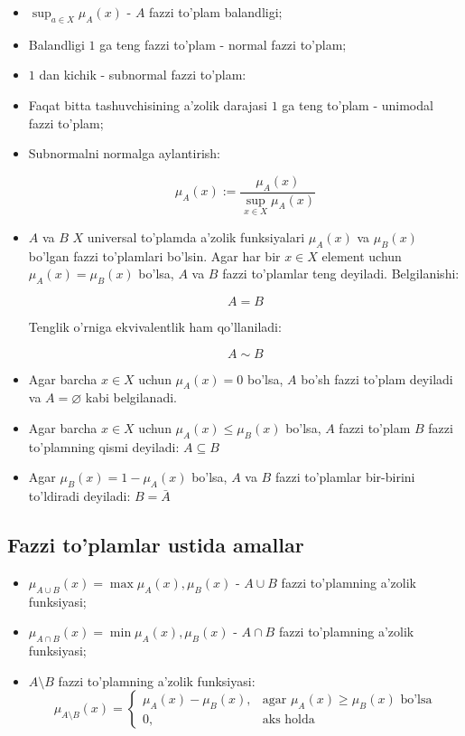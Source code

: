 \documentclass[12pt]{article}
\begin{document}
\begin{itemize}
	\item $\sup_{a\in X}\mu_A(x)$ - $A$ fazzi to'plam balandligi;
	\item Balandligi $1$ ga teng fazzi to'plam - normal fazzi to'plam;
	\item $1$ dan kichik - subnormal fazzi to'plam:
	\item Faqat bitta tashuvchisining a'zolik darajasi $1$ ga teng to'plam - unimodal fazzi to'plam;
	\item Subnormalni normalga aylantirish:
	
	\[\mu_A(x):=\frac{\mu_A(x)}{\sup_{x\in X}\mu_A(x)}\]
	
	\item $A$ va $B$ $X$ universal to'plamda a'zolik funksiyalari $\mu_A(x)$ va $\mu_B(x)$ bo'lgan fazzi to'plamlari bo'lsin.
	Agar har bir $x\in X$ element uchun $\mu_A(x)=\mu_B(x)$ bo'lsa, $A$ va $B$ fazzi to'plamlar teng deyiladi. Belgilanishi:

	\[A=B\]
	
	Tenglik o'rniga ekvivalentlik ham qo'llaniladi:
	
	\[A\sim B\]
	
	\item Agar barcha $x\in X$ uchun $\mu_A(x)=0$ bo'lsa, $A$ bo'sh fazzi to'plam deyiladi va $A=\varnothing $ kabi belgilanadi.
	
	\item Agar barcha $x\in X$ uchun $\mu_A(x)\leqslant \mu_B(x)$ bo'lsa, $A$ fazzi to'plam $B$ fazzi to'plamning qismi deyiladi: $A\subseteq B$
	
	\item Agar $\mu_B(x)=1-\mu_A(x)$ bo'lsa, $A$ va $B$ fazzi to'plamlar bir-birini to'ldiradi deyiladi: $B=\bar{A}$
\end{itemize}

\subsection{Fazzi to'plamlar ustida amallar}

\begin{itemize}
	\item $\mu_{A\cup B}(x)=\max{\mu_A(x), \mu_B(x)}$ - $A \cup B$ fazzi to'plamning a'zolik funksiyasi;
	
	\item $\mu_{A\cap B}(x)=\min{\mu_A(x), \mu_B(x)}$ - $A \cap B$ fazzi to'plamning a'zolik funksiyasi;
	
	\item $A\setminus B$ fazzi to'plamning a'zolik funksiyasi:
	\[
	\mu_{A\setminus B}(x)=
	\begin{cases}
		\mu_A(x)-\mu_B(x), & \text{agar }\mu_A(x)\geq \mu_B(x)\text{ bo'lsa} \\
		0, & \text{aks holda}
	\end{cases}
	\] 
\end{itemize}


	
\end{document}
